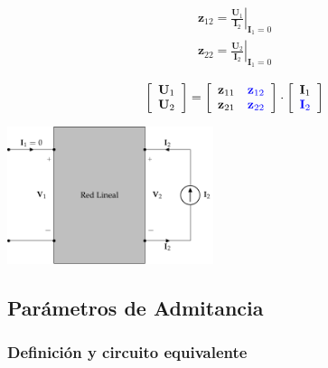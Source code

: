 \documentclass[10pt]{article}
\begin{document}
\vspace{1cm}

\begin{minipage}{0.5\textwidth}
  \[
    \begin{array}{c}
      \mathbf{z}_{12} = \left.\frac{\mathbf{U}_1}{\mathbf{I}_2}\right\rvert_{\mathbf{I}_1 = 0}\\
      \mathbf{z}_{22} = \left.\frac{\mathbf{U}_2}{\mathbf{I}_2}\right\rvert_{\mathbf{I}_1 = 0}
    \end{array}
  \]

  \[
    \left[
      \begin{array}{c}
        \mathbf{U}_1\\
        \mathbf{U}_2
      \end{array}
    \right] =
    \left[
      \begin{array}{cc}
        \mathbf{z}_{11} & \color{blue}{\mathbf{z}_{12}}\\
        \mathbf{z}_{21} & \color{blue}{\mathbf{z}_{22}}
      \end{array}
    \right] \cdot
    \left[
      \begin{array}{c}
        \mathbf{I}_1\\
        \color{blue}{\mathbf{I}_2}
      \end{array}
    \right]
  \]
\end{minipage}
\begin{minipage}{0.5\textwidth}
  \begin{center}
    \includegraphics[height=4cm]{../figs/parametrosZ_salida.pdf}
  \end{center}
\end{minipage}

\clearpage

\subsection{Parámetros de Admitancia}

\subsubsection*{Definición y circuito equivalente}
\end{document}
